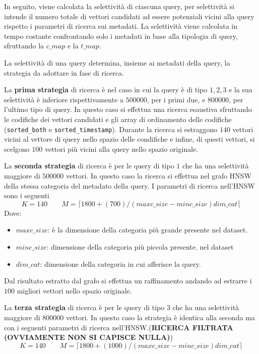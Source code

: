 In seguito, viene calcolata la selettività di ciascuna query, per selettività
si intende il numero totale di vettori candidati ad essere potenziali vicini alla 
query rispetto i parametri di ricerca sui metadati. 
La selettività viene calcolata in tempo costante confrontando solo i metadati in 
base alla tipologia di query, sfruttando la $c\_map$ e la $t\_map$. 

La selettività di una query determina, insieme ai metadati della query, la strategia 
da adottare in fase di ricerca.

La \textbf{prima strategia} di ricerca è nel caso in cui la query è di tipo $1,2,3$ 
e la sua selettività è inferiore rispettivamente a $500000$, per i primi due, e $800000$, 
per l'ultimo tipo di query. In questo caso 
si effettua una ricerca esaustiva sfruttando le codifiche dei vettori candidati 
e gli array di ordinamento delle codifiche (\texttt{sorted\_both} e \texttt{sorted\_timestamp}).
Durante la ricerca si estraggono $140$ vettori vicini al vettore di query nello 
spazio delle condifiche e infine, di questi vettori, si scelgono $100$ vettori 
più vicini alla query nello spazio originale. 

La \textbf{seconda strategia} di ricerca è per le query di tipo $1$ che ha una selettività 
maggiore di $500000$ vettori. In questo caso la ricerca si effettua nel grafo 
HNSW della stessa categoria del metadato della query. I parametri di ricerca nell'HNSW
sono i seguenti 
$$K = 140 \qquad M= \lceil1800+(700)/(maxc\_size - minc\_size)dim\_cat\rceil$$
Dove:
\begin{itemize}
    \item $maxc\_size$: è la dimensione della categoria più grande presente 
    nel dataset.
    \item $minc\_size$: dimensione della categoria più piccola presente.
    nel dataset
    \item $dim\_cat$: dimensione della categoria in cui afferisce la query.
\end{itemize}
Dal risultato estratto dal grafo si effettua un raffinamento andando ad estrarre 
i $100$ migliori vettori nello spazio originale.

La \textbf{terza strategia} di ricerca è per le query di tipo $3$ che ha una selettività 
maggiore di $800000$ vettori. In questo caso la strategia è identica alla seconda 
ma con i seguenti parametri di ricerca nell'HNSW.(\textbf{RICERCA FILTRATA (OVVIAMENTE NON SI CAPISCE NULLA)}) 
$$K = 140 \qquad M= \lceil1800+(1000)/(maxc\_size - minc\_size)dim\_cat\rceil$$

